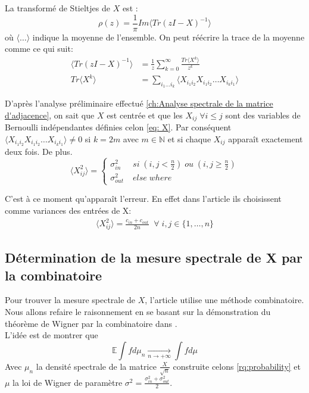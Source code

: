 La transformé de Stieltjes de $X$ est :
\begin{equation}
	\rho(z) = \frac{1}{\pi} Im\langle Tr(zI - X)^{-1}\rangle
\end{equation}
où $\langle \dots \rangle$ indique la moyenne de l'ensemble.
On peut réécrire la trace de la moyenne comme ce qui suit: 
\begin{align}
	\langle Tr(zI - X)^{-1}\rangle &= \frac{1}{z}\sum_{k=0}^{\infty} \frac{Tr\langle X^k\rangle}{z^k} \\
	Tr\langle X^k\rangle &= \sum_{i_1\dots i_k}\langle X_{i_1i_2}X_{i_1i_2}\dots X_{i_ki_1}\rangle \label{eq: trace Xk}
\end{align}

D'après l'analyse préliminaire effectué \autoref{ch:Analyse spectrale de la matrice d'adjacence}, on sait que $X$ est centrée et que les $X_{ij} \; \forall i\leq j$ sont des variables de Bernoulli indépendantes définies celon \eqref{eq: X}.
Par conséquent $\langle X_{i_1i_2}X_{i_1i_2}\dots X_{i_ki_1}\rangle \neq 0$ si $k = 2m$ avec $m\in \mathbb{N}$ et si chaque $X_{ij}$ apparaît exactement deux fois.
De plus.
\begin{equation}
	\langle X_{ij}^2\rangle = \left\{
	\begin{array}{lr}
		\sigma_{in}^2  &\; si \; (i,j < \frac{n}{2}) \; ou \; (i,j \ge \frac{n}{2}) \\
		\sigma_{out}^2 &\; else \; where
	\end{array}
\right.\nonumber
\end{equation}

C'est à ce moment qu’apparaît l'erreur.  
En effet dans l'article ils choisissent comme variances des entrées de X: 
\begin{align*}
	\langle X_{ij}^2 \rangle = \frac{c_{in} + c_{out}}{2n} \;\; \forall \; i,j \in \{1, \dots, n\} 
\end{align*}
\subsection{Détermination de la mesure spectrale de X par la combinatoire}
Pour trouver la mesure spectrale de $X$, l'article utilise une méthode combinatoire.
Nous allons refaire le raisonnement en se basant sur la démonstration du théorème de Wigner par la combinatoire dans \cite[Introduction aux matrices aléatoires]{wigner}.\\

L'idée est de montrer que 
\begin{equation}
	\mathbb{E}\int f d\mu_n\xrightarrow[n \to +\infty]{}\int f d\mu
\end{equation}
Avec $\mu_n$ la densité spectrale de la matrice $\frac{X}{\sqrt{n}}$ construite celons \autoref{rq:probability} et $\mu$ la loi de Wigner de paramètre $\sigma^2 = \frac{\sigma_{in}^2 + \sigma_{out}^2}{2}$.

